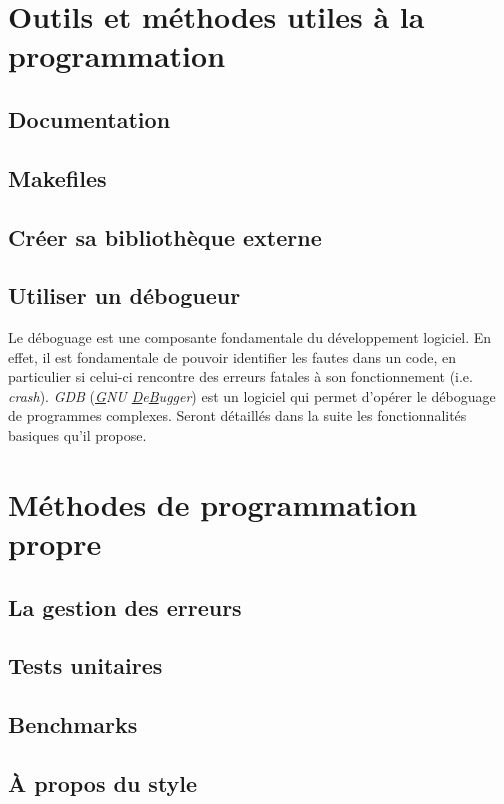 \documentclass{minitelreport}
\begin{document}
\begin{refsection}
	\chapter{Outils et méthodes utiles à la programmation}
		\section{Documentation}
		
		\section{Makefiles}
		
		\section{Créer sa bibliothèque externe}
		\section{Utiliser un débogueur}
		Le déboguage est une composante fondamentale du développement logiciel. En effet, il est fondamentale de pouvoir identifier les fautes dans un code, en particulier si celui-ci rencontre des erreurs fatales à son fonctionnement (i.e. \textit{crash}). \textit{GDB} (\textit{\underline{G}NU \underline{D}e\underline{B}ugger}) est un logiciel qui permet d'opérer le déboguage de programmes complexes. Seront détaillés dans la suite les fonctionnalités basiques qu'il propose.
	\chapter{Méthodes de programmation propre}
		\section{La gestion des erreurs}
		
		\section{Tests unitaires}
		
		\section{Benchmarks}
		
		\section{À propos du style}
		


\end{refsection}
\end{document}
